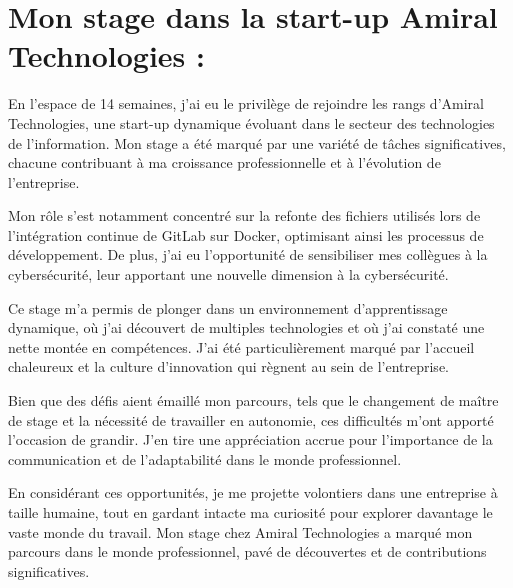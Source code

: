 \section*{Mon stage dans la start-up Amiral Technologies :}
En l'espace de 14 semaines, j'ai eu le privilège de rejoindre les rangs d'Amiral Technologies, une start-up dynamique évoluant dans le secteur des technologies de l'information.
Mon stage a été marqué par une variété de tâches significatives, chacune contribuant à ma croissance professionnelle et à l'évolution de l'entreprise.

Mon rôle s'est notamment concentré sur la refonte des fichiers utilisés lors de l'intégration continue de GitLab sur Docker, optimisant ainsi les processus de développement.
De plus, j'ai eu l'opportunité de sensibiliser mes collègues à la cybersécurité, leur apportant une nouvelle dimension à la cybersécurité.

Ce stage m'a permis de plonger dans un environnement d'apprentissage dynamique, où j'ai découvert de multiples technologies et où j'ai constaté une nette montée en compétences.
J'ai été particulièrement marqué par l'accueil chaleureux et la culture d'innovation qui règnent au sein de l'entreprise.

Bien que des défis aient émaillé mon parcours, tels que le changement de maître de stage et la nécessité de travailler en autonomie, ces difficultés m'ont apporté l'occasion de grandir.
J'en tire une appréciation accrue pour l'importance de la communication et de l'adaptabilité dans le monde professionnel.

En considérant ces opportunités, je me projette volontiers dans une entreprise à taille humaine, tout en gardant intacte ma curiosité pour explorer davantage le vaste monde du travail.
Mon stage chez Amiral Technologies a marqué mon parcours dans le monde professionnel, pavé de découvertes et de contributions significatives.
